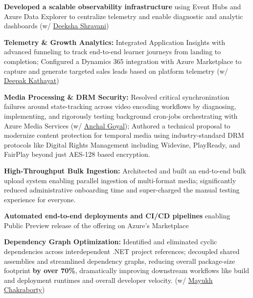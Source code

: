 \documentclass[a4paper,11pt]{article}
\begin{document}
\vspace{2mm}
\item \textbf{Developed a scalable observability infrastructure} using Event Hubs and Azure Data Explorer to centralize telemetry and enable diagnostic and analytic dashboards (w/ \href{https://www.linkedin.com/in/deeksha-shravani-02b23b189/}{Deeksha Shravani})
\vspace{1mm}
\item \textbf{Telemetry \& Growth Analytics:} Integrated Application Insights with advanced funneling to track end-to-end learner journeys from landing to completion; Configured a Dynamics 365 integration with Azure Marketplace to capture and generate targeted sales leads based on platform telemetry (w/ \href{https://www.linkedin.com/in/dmkxyz/}{Deepak Kathayat}) 
\vspace{1mm}
\item \textbf{Media Processing \& DRM Security:} Resolved critical synchronization failures around state-tracking across video encoding workflows by diagnosing, implementing, and rigorously testing background cron-jobs orchestrating with Azure Media Services (w/ \href{https://www.linkedin.com/in/anchal-goyal-5096619b/}{Anchal Goyal}); Authored a technical proposal to modernize content protection for temporal media using industry-standard DRM protocols like Digital Rights Management including Widevine, PlayReady, and FairPlay beyond just AES-128 based encryption.
\vspace{1mm}
\item \textbf{High-Throughput Bulk Ingestion:} Architected and built an end-to-end bulk upload system enabling parallel ingestion of multi-format media; significantly reduced administrative onboarding time and super-charged the manual testing experience for everyone.
\vspace{1mm}
\item \textbf{Automated end-to-end deployments and CI/CD pipelines} enabling Public Preview release of the offering on Azure's Marketplace
\vspace{1mm}
\item \textbf{Dependency Graph Optimization:} Identified and eliminated cyclic dependencies across interdependent .NET project references; decoupled shared assemblies and streamlined dependency graphs, reducing overall package-size footprint \textbf{by over 70\%}, dramatically improving downstream workflows like build and deployment runtimes and overall developer velocity. (w/ \href{https://www.linkedin.com/in/cmayukh/}{Mayukh Chakraborty})
\end{document}
